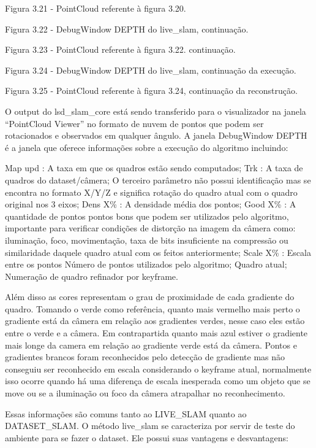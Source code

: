 Figura 3.21 - PointCloud referente à figura 3.20.


Figura 3.22 - DebugWindow DEPTH do live\_slam, continuação.

Figura 3.23 - PointCloud referente à figura 3.22. continuação.

Figura 3.24 - DebugWindow DEPTH do live\_slam, continuação da execução.

Figura 3.25 - PointCloud referente à figura 3.24, continuação da reconstrução.

O output do lsd\_slam\_core está sendo transferido para o visualizador na janela “PointCloud Viewer” no formato de nuvem de pontos que podem ser rotacionados e observados em qualquer ângulo. A janela DebugWindow DEPTH é a janela que oferece informações sobre a execução do algoritmo incluindo:

Map upd : A taxa em que os quadros estão sendo computados;
Trk : A taxa de quadros do dataset/câmera;
O terceiro parâmetro não possui identificação mas se encontra no formato X/Y/Z e significa rotação do quadro atual com o quadro original nos 3 eixos;
Dens X\% : A densidade média dos pontos;
Good X\% : A quantidade de pontos pontos bons que podem ser utilizados pelo algoritmo, importante para verificar condições de distorção na imagem da câmera como: iluminação, foco, movimentação, taxa de bits insuficiente na compressão ou similaridade daquele quadro atual com os feitos anteriormente;
Scale X\% : Escala entre os pontos
Número de pontos utilizados pelo algoritmo;
Quadro atual;
Numeração de quadro refinador por keyframe.

Além disso as cores representam o grau de proximidade de cada gradiente do quadro. Tomando o verde como referência, quanto mais vermelho mais perto o gradiente está da câmera em relação aos gradientes verdes, nesse caso eles estão entre o verde e a câmera. Em contrapartida quanto mais azul estiver o gradiente mais longe da camera em relação ao gradiente verde está da câmera. Pontos e gradientes brancos foram reconhecidos pelo detecção de gradiente mas não conseguiu ser reconhecido em escala considerando o keyframe atual, normalmente isso ocorre quando há uma diferença de escala inesperada como um objeto que se move ou se a iluminação ou foco da câmera atrapalhar no reconhecimento.

Essas informações são comuns tanto ao LIVE\_SLAM quanto ao DATASET\_SLAM. O método live\_slam se caracteriza por servir de teste do ambiente para se fazer o dataset. Ele possui suas vantagens e desvantagens:

